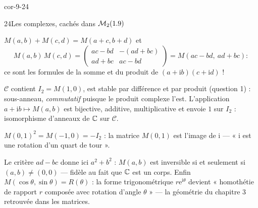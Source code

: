 \begin{blocLivre}{cor-9-24}
\begin{corrige}{24}{Les complexes, cachés dans $\mathcal{M}_2(1.9)$}
\begin{questions}
  \item $M(a,b)+M(c,d)=M(a+c,b+d)$ et
    \[
      M(a,b)\,M(c,d)=\begin{pmatrix}ac-bd&-(ad+bc)\\ad+bc&ac-bd\end{pmatrix}
      =M(ac-bd,\ ad+bc) :
    \]
    ce sont les formules de la somme et du produit de
    $(a+\mathrm{i}b)(c+\mathrm{i}d)$ !
  \item $\mathcal{C}$ contient $I_2=M(1,0)$, est stable par différence et
    par produit (question 1) : sous-anneau, \emph{commutatif} puisque le
    produit complexe l'est. L'application $a+\mathrm{i}b\mapsto M(a,b)$
    est bijective, additive, multiplicative et envoie $1$ sur $I_2$ :
    isomorphisme d'anneaux de $\mathbb{C}$ sur $\mathcal{C}$.
  \item $M(0,1)^{2}=M(-1,0)=-I_2$ : la matrice $M(0,1)$ est l'image de
    $\mathrm{i}$ — « $\mathrm{i}$ est une rotation d'un quart de tour ».
  \item Le critère $ad-bc$ donne ici $a^{2}+b^{2}$ : $M(a,b)$ est
    inversible si et seulement si $(a,b)\neq(0,0)$ — fidèle au fait que
    $\mathbb{C}$ est un corps. Enfin
    $M(\cos\theta,\sin\theta)=R(\theta)$ : la forme trigonométrique
    $r\mathrm{e}^{\mathrm{i}\theta}$ devient « homothétie de rapport $r$
    composée avec rotation d'angle $\theta$ » — la géométrie du chapitre 3
    retrouvée dans les matrices.
\end{questions}
\end{corrige}
\end{blocLivre}


